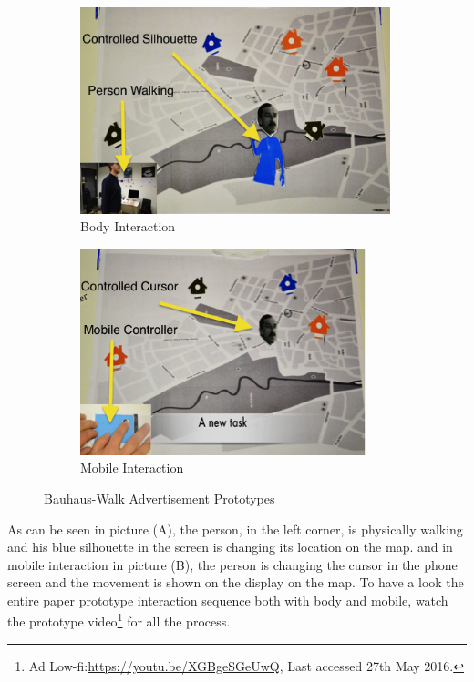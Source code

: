\begin{figure}[H]
    \centering
    \begin{subfigure}[H]{0.7\textwidth}
        \centering
        \includegraphics[width=\textwidth,height=6cm]{Figures/5/body_interaction}
        \caption{Body Interaction}
        \label{fig:body_inter_}
    \end{subfigure}
    \begin{subfigure}[H]{0.7\textwidth}
        \centering
        \includegraphics[width=\textwidth,height=6cm]{Figures/5/mobile_interactions}
        \caption{Mobile Interaction}
        \label{fig:mobile_inter}
    \end{subfigure}
    \caption{Bauhaus-Walk Advertisement Prototypes}
    \label{fig:Interactive_prototype}
\end{figure}

As can be seen in picture (A), the person, in the left corner, is physically walking and his blue silhouette in the screen is changing its location on the map.
and in mobile interaction in picture (B), the person is changing the cursor in the phone screen and the movement is shown on the display on the map.
To have a look the entire paper prototype interaction sequence both with body and mobile, watch the prototype video\footnote{Ad Low-fi:\url{https://youtu.be/XGBgeSGeUwQ}, Last accessed 27th May 2016. } for all the process. \\


